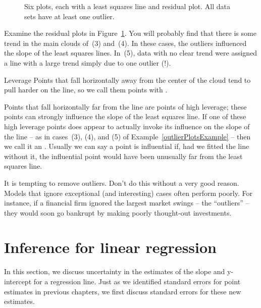 \begin{figure}
  \centering
  \caption{Six plots, each with a least squares line and
      residual plot. All data sets have at least one outlier.}
\label{outlierPlots}
\end{figure}

Examine the residual plots in Figure~\ref{outlierPlots}.
You will probably find that there is some trend in the main
clouds of~(3) and~(4).
In these cases, the outliers influenced the slope of the
least squares lines.
In~(5), data with no clear trend were assigned a line with
a large trend simply due to one outlier (!).
 
\begin{onebox}{Leverage}
  Points that fall horizontally away from the center of the
  cloud tend to pull harder on the line, so we call them points
  with .
\end{onebox}

Points that fall horizontally far from the line are points
of high leverage;
these points can strongly influence the slope of the least
squares line.
If one of these high leverage points does appear to actually
invoke its influence on the slope of the line --
as in cases~(3), (4), and (5) of Example~\ref{outlierPlotsExample}
-- then we call it an .
Usually we can say a point is influential if, had we fitted
the line without it, the influential point would have been
unusually far from the least squares line.

It is tempting to remove outliers.
Don't do this without a very good reason.
Models that ignore exceptional (and interesting) cases often
perform poorly.
For instance, if a financial firm ignored the largest market
swings -- the ``outliers'' --  they would soon go bankrupt
by making poorly thought-out investments.


{}








\section{Inference for linear regression}
\label{inferenceForLinearRegression}

In this section, we discuss uncertainty in the estimates
of the slope and y-intercept for a regression line.
Just as we identified standard errors for point estimates
in previous chapters, we first discuss standard errors for
these new estimates.


